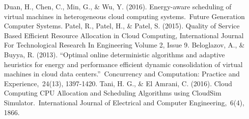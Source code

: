 \begin{thebibliography}{99}
\begin{LTRitems}
	  Duan, H., Chen, C., Min, G., \& Wu, Y. (2016). Energy-aware scheduling of virtual machines in heterogeneous cloud computing systems. Future Generation Computer Systems.
	  Patel, R., Patel, H., \& Patel, S. (2015). Quality of Service Based Efficient Resource Allocation in Cloud Computing, International Journal For Technological Research In Engineering Volume 2, Issue 9.
	  Beloglazov, A., \& Buyya, R. (2013). “Optimal online deterministic algorithms and adaptive heuristics for energy and performance efficient dynamic consolidation of virtual machines in cloud data centers.” Concurrency and Computation: Practice and Experience, 24(13), 1397-1420.
	  Tani, H. G., \& El Amrani, C. (2016). Cloud Computing CPU Allocation and Scheduling Algorithms using CloudSim Simulator. International Journal of Electrical and Computer Engineering, 6(4), 1866.
	\end{LTRitems}
\end{thebibliography}